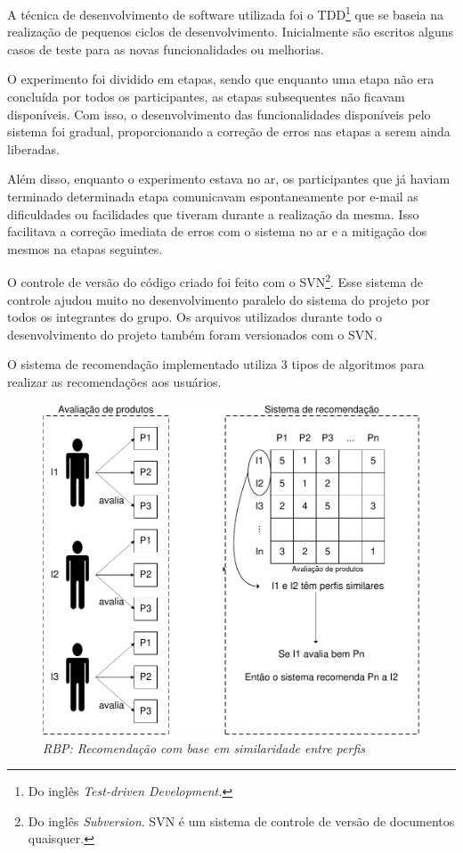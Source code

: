  A técnica de desenvolvimento de software utilizada foi o TDD\footnote{Do inglês \textit{Test-driven Development.}} que se baseia na realização de pequenos ciclos de desenvolvimento. Inicialmente são escritos alguns casos de teste para as novas funcionalidades ou melhorias.

 O experimento foi dividido em etapas, sendo que enquanto uma etapa não era concluída por todos os participantes, as etapas subsequentes não ficavam disponíveis. Com isso, o desenvolvimento das funcionalidades disponíveis pelo sistema foi gradual, proporcionando a correção de erros nas etapas a serem ainda liberadas.

 Além disso, enquanto o experimento estava no ar, os participantes que já haviam terminado determinada etapa comunicavam espontaneamente por e-mail as dificuldades ou facilidades que tiveram durante a realização da mesma. Isso facilitava a correção imediata de erros com o sistema no ar e a mitigação dos mesmos na etapas seguintes.

 O controle de versão do código criado foi feito com o SVN\footnote{Do inglês \textit{Subversion}. SVN é um sistema de controle de versão de documentos quaisquer.}. Esse sistema de controle ajudou muito no desenvolvimento paralelo do sistema do projeto por todos os integrantes do grupo. Os arquivos utilizados durante todo o desenvolvimento do projeto também foram versionados com o SVN.

 O sistema de recomendação implementado utiliza 3 tipos de algoritmos para realizar as recomendações aos usuários.

\begin{figure}
  \centering
  \includegraphics[width=\textwidth]{imagens/RBP}
  \caption{\it RBP: Recomendação com base em similaridade entre perfis}
  \label{fig:RBP}
\end{figure}
 
